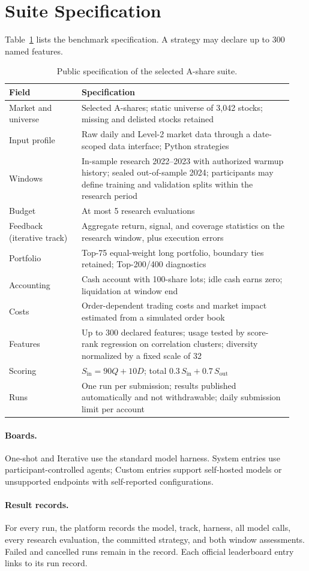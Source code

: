 \section{Suite Specification}
\label{app:registry}

Table~\ref{tab:suite_registry} lists the benchmark specification. A strategy may declare up to 300 named features.

\begin{table}[htbp]
\centering\small
\caption{Public specification of the selected A-share suite.}
\label{tab:suite_registry}
\begin{tabular}{@{}p{0.24\linewidth}p{0.70\linewidth}@{}}
\toprule
Field & Specification \\
\midrule
Market and universe & Selected A-shares; static universe of 3,042 stocks; missing and delisted stocks retained \\
Input profile & Raw daily and Level-2 market data through a date-scoped data interface; Python strategies \\
Windows & In-sample research 2022--2023 with authorized warmup history; sealed out-of-sample 2024; participants may define training and validation splits within the research period \\
Budget & At most 5 research evaluations \\
Feedback (iterative track) & Aggregate return, signal, and coverage statistics on the research window, plus execution errors \\
Portfolio & Top-75 equal-weight long portfolio, boundary ties retained; Top-200/400 diagnostics \\
Accounting & Cash account with 100-share lots; idle cash earns zero; liquidation at window end \\
Costs & Order-dependent trading costs and market impact estimated from a simulated order book \\
Features & Up to 300 declared features; usage tested by score-rank regression on correlation clusters; diversity normalized by a fixed scale of 32 \\
Scoring & $S_{\mathrm{in}}=90Q+10D$; total $0.3\,S_{\mathrm{in}}+0.7\,S_{\mathrm{out}}$ \\
Runs & One run per submission; results published automatically and not withdrawable; daily submission limit per account \\
\bottomrule
\end{tabular}
\end{table}

\paragraph{Boards.} One-shot and Iterative use the standard model harness. System entries use participant-controlled agents; Custom entries support self-hosted models or unsupported endpoints with self-reported configurations.

\paragraph{Result records.} For every run, the platform records the model, track, harness, all model calls, every research evaluation, the committed strategy, and both window assessments. Failed and cancelled runs remain in the record. Each official leaderboard entry links to its run record.
